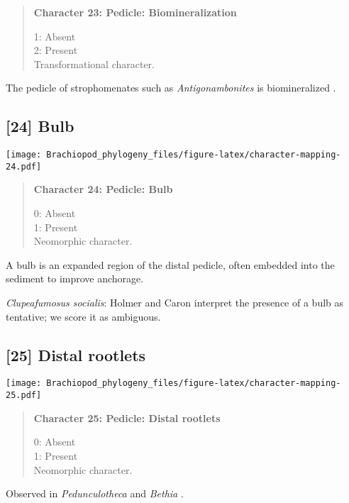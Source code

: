 \documentclass[openany]{book}
\theoremstyle{definition}
\theoremstyle{definition}
\theoremstyle{definition}
\theoremstyle{remark}
\begin{document}
\begin{quote}
\textbf{Character 23: Pedicle: Biomineralization}

1: Absent\\
2: Present\\
Transformational character.
\end{quote}

The pedicle of strophomenates such as \emph{Antigonambonites} is
biomineralized \citep{Holmer2018Evolutionarysignificance}.

\subsection*{{[}24{]} Bulb}\label{bulb}

\texttt{[image: Brachiopod\_phylogeny\_files/figure-latex/character-mapping-24.pdf]}

\begin{quote}
\textbf{Character 24: Pedicle: Bulb}

0: Absent\\
1: Present\\
Neomorphic character.
\end{quote}

A bulb is an expanded region of the distal pedicle, often embedded into
the sediment to improve anchorage.

\hypertarget{Clupeafumosus_socialis-coding-24}{}
\emph{Clupeafumosus socialis}: Holmer and Caron
\citeyearpar{Holmer2006Aspinose} interpret the presence of a bulb as
tentative; we score it as ambiguous.

\subsection*{{[}25{]} Distal rootlets}\label{distal-rootlets}

\texttt{[image: Brachiopod\_phylogeny\_files/figure-latex/character-mapping-25.pdf]}

\begin{quote}
\textbf{Character 25: Pedicle: Distal rootlets}

0: Absent\\
1: Present\\
Neomorphic character.
\end{quote}

Observed in \emph{Pedunculotheca} and \emph{Bethia}
\citep{Sutton2005Silurianbrachiopods}.
\end{document}
